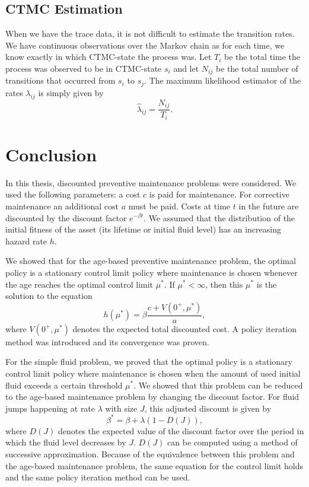 \section{CTMC Estimation}
When we have the trace data, it is not difficult to estimate the transition rates.
We have continuous observations over the Markov chain as for each time, we know exactly in which CTMC-state the process was.
Let $T_i$ be the total time the process was observed to be in CTMC-state $s_i$ and let $N_{ij}$ be the total number of transitions that occurred from $s_i$ to $s_j$.
The maximum likelihood estimator of the rates $\lambda_{ij}$ is simply given by \cite{Inamura2006}
\[
\hat\lambda_{ij}=\frac{N_{ij}}{T_i}.
\]



\chapter{Conclusion}\label{chapter:Conclusion}

In this thesis, discounted preventive maintenance problems were considered.
We used the following parameters:
a cost $c$ is paid for maintenance.
For corrective maintenance an additional cost $a$ must be paid.
Costs at time $t$ in the future are discounted by the discount factor $e^{-\beta t}$.
We assumed that the distribution of the initial fitness of the asset (its lifetime or initial fluid level) has an increasing hazard rate $h$.

We showed that for the age-based preventive maintenance problem, the optimal policy is a stationary control limit policy where maintenance is chosen whenever the age reaches the optimal control limit $\mu^*$.
If $\mu^*<\infty$, then this $\mu^*$ is the solution to the equation
\begin{equation}\label{eq:SummaryAgeControlLimit}
h(\mu^*)=\beta\frac{c+V(0^+,\mu^*)}{a},
\end{equation}
where $V(0^+,\mu^*)$ denotes the expected total discounted cost.
A policy iteration method was introduced and its convergence was proven.

For the simple fluid problem, we proved that the optimal policy is a stationary control limit policy where maintenance is chosen when the amount of used initial fluid exceeds a certain threshold $\mu^*$.
We showed that this problem can be reduced to the age-based maintenance problem by changing the discount factor.
For fluid jumps happening at rate $\lambda$ with size $J$, this adjusted discount is given by
\[
\beta^*=\beta+\lambda(1-D(J)),
\]
where $D(J)$ denotes the expected value of the discount factor over the period in which the fluid level decreases by $J$.
$D(J)$ can be computed using a method of successive approximation.
Because of the equivalence between this problem and the age-based maintenance problem, the same equation for the control limit holds and the same policy iteration method can be used.

